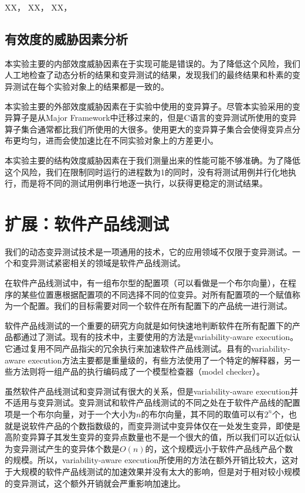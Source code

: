 \documentclass[nofonts]{ctexrep}
\begin{document}
XX，
XX，
XX，

\section{有效度的威胁因素分析}
本实验主要的内部效度威胁因素在于实现可能是错误的。为了降低这个风险，我们人工地检查了动态分析的结果和变异测试的结果，发现我们的最终结果和朴素的变异测试在每个实验对象上的结果都是一致的。

本实验主要的外部效度威胁因素在于实验中使用的变异算子。尽管本实验采用的变异算子是从Major Framework中迁移过来的，但是C语言的变异测试所使用的变异算子集合通常都比我们所使用的大很多。使用更大的变异算子集合会使得变异点分布更均匀，进而会使加速比在不同实验对象上的方差更小。

本实验主要的结构效度威胁因素在于我们测量出来的性能可能不够准确。为了降低这个风险，我们在限制同时运行的进程数为1的同时，没有将测试用例并行化地执行，而是将不同的测试用例串行地逐一执行，以获得更稳定的测试结果。



\chapter{扩展：软件产品线测试}
我们的动态变异测试技术是一项通用的技术，它的应用领域不仅限于变异测试。一个和变异测试紧密相关的领域是软件产品线测试。

在软件产品线测试中，有一组布尔型的配置项（可以看做是一个布尔向量），在程序的某些位置惠根据配置项的不同选择不同的位变异。对所有配置项的一个赋值称为一个配置。我们的目标需要对同一个软件在所有配置下的产品统一进行测试。

软件产品线测试的一个重要的研究方向就是如何快速地判断软件在所有配置下的产品都通过了测试。现有的技术中，主要使用的方法是variability-aware execution。它通过复用不同产品指尖的冗余执行来加速软件产品线测试。县有的variability-aware execution方法主要都是重量级的，有些方法使用了一个特定的解释器，另一些方法则将一组产品的执行编码成了一个模型检查器（model checker）。

虽然软件产品线测试和变异测试有很大的关系，但是variability-aware execution并不适用与变异测试。变异测试和软件产品线测试的不同之处在于软件产品线的配置项是一个布尔向量，对于一个大小为$n$的布尔向量，其不同的取值可以有$2^n$个，也就是说软件产品的个数指数级的，而变异测试中变异体仅在一处发生变异，即使是高阶变异算子其发生变异的变异点数量也不是一个很大的值，所以我们可以近似认为变异测试产生的变异体个数是$O(n)$的，这个规模远小于软件产品线产品个数的规模。所以，variability-aware execution所使用的方法在额外开销比较大，这对于大规模的软件产品线测试的加速效果并没有太大的影响，但是对于相对较小规模的变异测试，这个额外开销就会严重影响加速比。
\end{document}
